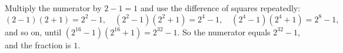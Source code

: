 Multiply the numerator by $2-1=1$ and use the difference of squares repeatedly:
\[(2-1)(2+1)=2^2-1,\quad\left(2^2-1\right)\left(2^2+1\right)=2^4-1,\quad\left(2^4-1\right)\left(2^4+1\right)=2^8-1,\]
and so on, until $\left(2^{16}-1\right)\left(2^{16}+1\right)=2^{32}-1$. So the numerator equals $2^{32}-1$, and the fraction is $\boxed{1}$.
